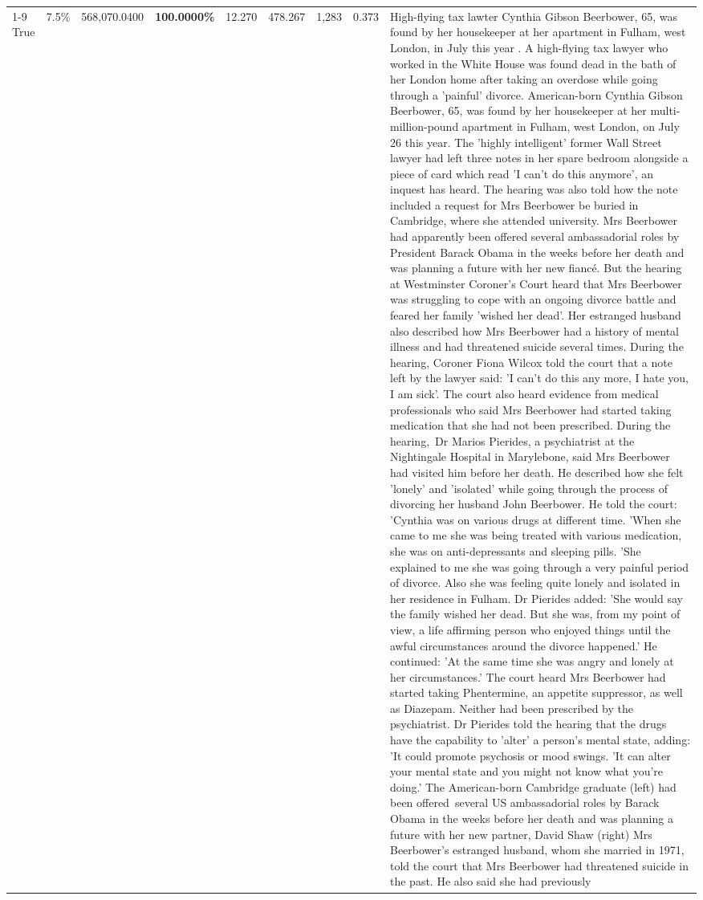 \begin{table}[H]
\begin{tabular}{lllrlllll}
\cline{1-9}
True & 7.5\% & 568,070.0400 & \bfseries \color{red} 100.0000\% & 12.270 & 478.267 & 1,283 & 0.373 & High-flying tax lawter Cynthia Gibson Beerbower, 65, was found by her housekeeper at her apartment in Fulham, west London, in July this year . A high-flying tax lawyer who worked in the White House was found dead in the bath of her London home after taking an overdose while going through a 'painful' divorce. American-born Cynthia Gibson Beerbower, 65, was found by her housekeeper at her multi-million-pound apartment in Fulham, west London, on July 26 this year. The 'highly intelligent' former Wall Street lawyer had left three notes in her spare bedroom alongside a piece of card which read 'I can't do this anymore', an inquest has heard. The hearing was also told how the note included a request for Mrs Beerbower be buried in Cambridge, where she attended university. Mrs Beerbower had apparently been offered several ambassadorial roles by President Barack Obama in the weeks before her death and was planning a future with her new fiancé. But the hearing at Westminster Coroner's Court heard that Mrs Beerbower was struggling to cope with an ongoing divorce battle and feared her family 'wished her dead'. Her estranged husband also described how Mrs Beerbower had a history of mental illness and had threatened suicide several times. During the hearing, Coroner Fiona Wilcox told the court that a note left by the lawyer said: 'I can't do this any more, I hate you, I am sick'. The court also heard evidence from medical professionals who said Mrs Beerbower had started taking medication that she had not been prescribed. During the hearing, Dr Marios Pierides, a psychiatrist at the Nightingale Hospital in Marylebone, said Mrs Beerbower had visited him before her death. He described how she felt 'lonely' and 'isolated' while going through the process of divorcing her husband John Beerbower. He told the court: 'Cynthia was on various drugs at different time. 'When she came to me she was being treated with various medication, she was on anti-depressants and sleeping pills. 'She explained to me she was going through a very painful period of divorce. Also she was feeling quite lonely and isolated in her residence in Fulham. Dr Pierides added: 'She would say the family wished her dead. But she was, from my point of view, a life affirming person who enjoyed things until the awful circumstances around the divorce happened.' He continued: 'At the same time she was angry and lonely at her circumstances.' The court heard Mrs Beerbower had started taking Phentermine, an appetite suppressor, as well as Diazepam. Neither had been prescribed by the psychiatrist. Dr Pierides told the hearing that the drugs have the capability to 'alter' a person's mental state, adding: 'It could promote psychosis or mood swings. 'It can alter your mental state and you might not know what you're doing.' The American-born Cambridge graduate (left) had been offered several US ambassadorial roles by Barack Obama in the weeks before her death and was planning a future with her new partner, David Shaw (right) Mrs Beerbower's estranged husband, whom she married in 1971, told the court that Mrs Beerbower had threatened suicide in the past. He also said she had previously 
\end{tabular}
\end{table}

